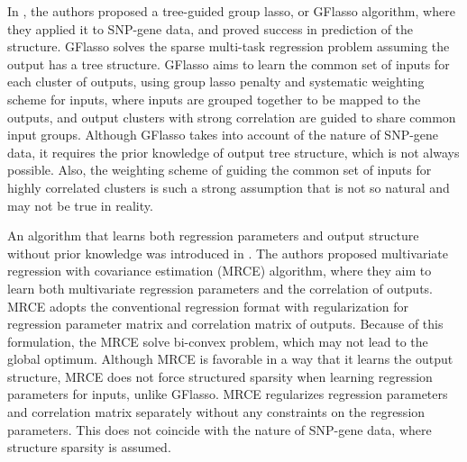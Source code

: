 \documentclass{article}
\begin{document}
In \cite{kim2010tree}, the authors proposed a tree-guided group lasso, or GFlasso algorithm, where they applied it to SNP-gene data, and proved success in prediction of the structure.
GFlasso solves the sparse multi-task regression problem assuming the output has a tree structure. 
GFlasso aims to learn the common set of inputs for each cluster of outputs, using group lasso penalty and systematic weighting scheme for inputs, where inputs are grouped together to be mapped to the outputs, and output clusters with strong correlation are guided to share common input groups.
Although GFlasso takes into account of the nature of SNP-gene data, it requires the prior knowledge of output tree structure, which is not always possible.
Also, the weighting scheme of guiding the common set of inputs for highly correlated clusters is such a strong assumption that is not so natural and may not be true in reality.

An algorithm that learns both regression parameters and output structure without prior knowledge was introduced in \cite{rothman2010sparse}. The authors proposed multivariate regression with covariance estimation (MRCE) algorithm, where they aim to learn both multivariate regression parameters and the correlation of outputs. 
MRCE adopts the conventional regression format with regularization for regression parameter matrix and correlation matrix of outputs.
Because of this formulation, the MRCE solve bi-convex problem, which may not lead to the global optimum. Although MRCE is favorable in a way that it learns the output structure, MRCE does not force structured sparsity when learning regression parameters for inputs, unlike GFlasso.
MRCE regularizes regression parameters and correlation matrix separately without any constraints on the regression parameters. This does not coincide with the nature of SNP-gene data, where structure sparsity is assumed.
\end{document}
